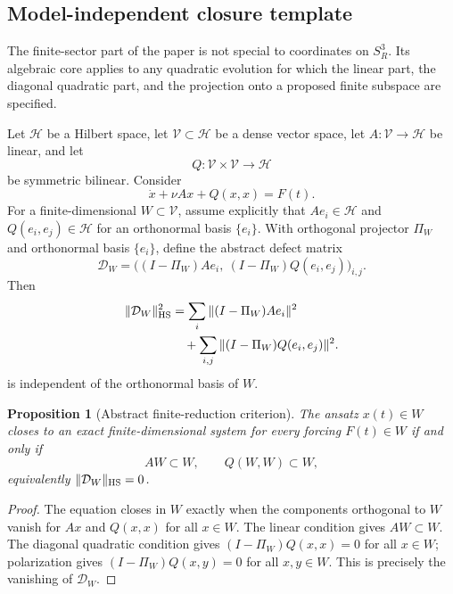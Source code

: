 \documentclass[aps,prd,reprint,superscriptaddress,nofootinbib,floatfix]{revtex4-2}
\newtheorem{proposition}[theorem]{Proposition}
\theoremstyle{definition}
\theoremstyle{remark}
\begin{document}
\subsection{Model-independent closure template}\label{subsec:abstracttemplate}

The finite-sector part of the paper is not special to coordinates on \(S^3_R\).  Its algebraic core applies to any quadratic evolution for which the linear part, the diagonal quadratic part, and the projection onto a proposed finite subspace are specified.

Let \(\mathcal H\) be a Hilbert space, let \(\mathcal V\subset\mathcal H\) be a dense vector space, let \(A:\mathcal V\to\mathcal H\) be linear, and let
\[
	Q:\mathcal V\times\mathcal V\to\mathcal H
\]
be symmetric bilinear.  Consider
\begin{equation}
	\dot x+\nu A x+Q(x,x)=F(t).
	\label{eq:abstractquadratic}
\end{equation}
For a finite-dimensional \(W\subset\mathcal V\), assume explicitly that \(Ae_i\in\mathcal H\) and \(Q(e_i,e_j)\in\mathcal H\) for an orthonormal basis \(\{e_i\}\).  With orthogonal projector \(\Pi_W\) and orthonormal basis \(\{e_i\}\), define the abstract defect matrix
\begin{equation}
	\mathcal D_W=
	\bigl((I-\Pi_W)Ae_i,\ (I-\Pi_W)Q(e_i,e_j)\bigr)_{i,j}.
	\label{eq:abstractdefectmatrix}
\end{equation}
Then
\begin{align}
	\|\mathcal D_W\|_{\rm HS}^2
	 & =
	\sum_i\|(I-\Pi_W)Ae_i\|^2 \nonumber \\
	 & \quad+
	\sum_{i,j}\|(I-\Pi_W)Q(e_i,e_j)\|^2 .
	\label{eq:abstractdefect}
\end{align}
is independent of the orthonormal basis of \(W\).

\begin{proposition}[Abstract finite-reduction criterion]\label{prop:abstractclosure}
	The ansatz \(x(t)\in W\) closes to an exact finite-dimensional system for every forcing \(F(t)\in W\) if and only if
	\[
		AW\subset W,\qquad Q(W,W)\subset W,
	\]
	equivalently \(\|\mathcal D_W\|_{\rm HS}=0\).
\end{proposition}

\begin{proof}
	The equation closes in \(W\) exactly when the components orthogonal to \(W\) vanish for \(Ax\) and \(Q(x,x)\) for all \(x\in W\).  The linear condition gives \(AW\subset W\).  The diagonal quadratic condition gives \((I-\Pi_W)Q(x,x)=0\) for all \(x\in W\); polarization gives \((I-\Pi_W)Q(x,y)=0\) for all \(x,y\in W\).  This is precisely the vanishing of \(\mathcal D_W\).
\end{proof}
\end{document}
